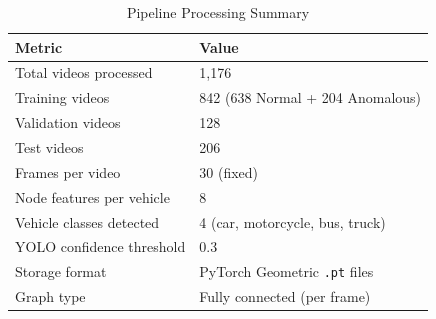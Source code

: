 \begin{table}[H]
\centering
\caption{Pipeline Processing Summary}
\label{tab:pipeline_summary}
\begin{tabular}{ll}
\toprule
\textbf{Metric} & \textbf{Value} \\
\midrule
Total videos processed & 1,176 \\
Training videos & 842 (638 Normal + 204 Anomalous) \\
Validation videos & 128 \\
Test videos & 206 \\
Frames per video & 30 (fixed) \\
Node features per vehicle & 8 \\
Vehicle classes detected & 4 (car, motorcycle, bus, truck) \\
YOLO confidence threshold & 0.3 \\
Storage format & PyTorch Geometric \texttt{.pt} files \\
Graph type & Fully connected (per frame) \\
\bottomrule
\end{tabular}
\end{table}
